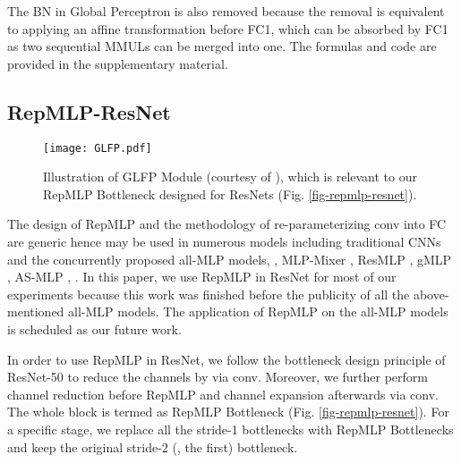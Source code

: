 \documentclass[10pt,twocolumn,letterpaper]{article}
\begin{document}
The BN in Global Perceptron is also removed because the removal is equivalent to applying an affine transformation before FC1, which can be absorbed by FC1 as two sequential MMULs can be merged into one. The formulas and code are provided in the supplementary material.



\subsection{RepMLP-ResNet}

\begin{figure}
	\begin{center}
		\texttt{[image: GLFP.pdf]}
		\vspace{-0.20in}
		\caption{Illustration of GLFP Module (courtesy of \cite{xiapatent}), which is relevant to our RepMLP Bottleneck designed for ResNets (Fig. \ref{fig-repmlp-resnet}).}
		\label{fig-GLFP}
		\vspace{-0.3in}
	\end{center}
\end{figure}

The design of RepMLP and the methodology of re-parameterizing conv into FC are generic hence may be used in numerous models including traditional CNNs and the concurrently proposed all-MLP models, \eg, MLP-Mixer \cite{tolstikhin2021mlp}, ResMLP \cite{touvron2021resmlp}, gMLP \cite{liu2021pay}, AS-MLP \cite{lian2021mlp}, \etc. In this paper, we use RepMLP in ResNet for most of our experiments because this work was finished before the publicity of all the above-mentioned all-MLP models. The application of RepMLP on the all-MLP models is scheduled as our future work.

In order to use RepMLP in ResNet, we follow the bottleneck \cite{he2016deep} design principle of ResNet-50 to reduce the channels by  via  conv. Moreover, we further perform  channel reduction before RepMLP and  channel expansion afterwards via  conv. The whole block is termed as RepMLP Bottleneck (Fig. \ref{fig-repmlp-resnet}). For a specific stage, we replace all the stride-1 bottlenecks with RepMLP Bottlenecks and keep the original stride-2 (\ie, the first) bottleneck.
\end{document}
